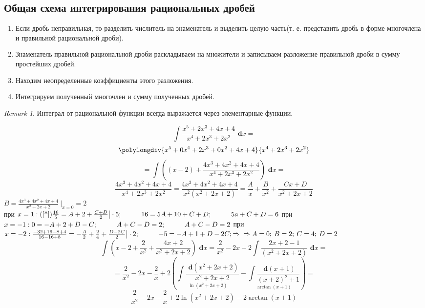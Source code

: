 \documentclass[a4paper,12pt, centered]{bookest}
\theoremstyle{remark}
\newtheorem*{remark}{Remark}
\newcommand\tab[1][1cm]{\hspace*{#1}}
\newcommand\dx{\textbf{ d}x}
\newcommand\dy{\textbf{ d}}
\begin{document}
\subsection{Общая схема интегрирования рациональных дробей}
\begin{enumerate}
	\item Если дробь неправильная, то разделить числитель на знаменатель и выделить целую часть(т. е. представить дробь в форме многочлена и правильной рациональной дроби).
	\item Знаменатель правильной рациональной дроби раскладываем на множители и записываем разложение правильной дроби в сумму простейших дробей.
	\item Находим неопределенные коэффициенты этого разложения.
	\item Интегрируем полученный многочлен и сумму полученных дробей.	  
\end{enumerate}
\begin{remark}
Интеграл от рациональной функции всегда выражается через элементарные функции.	
\end{remark}
\begin{example}
	$$\int \frac{x^5+2x^3+4x+4}{x^4+2x^3+2x^2}\dx=$$
		\[
    		\polylongdiv{x^5+0x^4+2x^3+0x^2+4x+4}{x^4+2x^3+2x^2}
  		\]
	$$=\int \left((x-2)+\frac{4x^3+4x^2+4x+4}{x^4+2x^3+2x^2}\right)\dx=$$
	\begin{equation}\label{*}
		\frac{4x^3+4x^2+4x+4}{x^4+2x^3+2x^2}=\frac{4x^3+4x^2+4x+4}{x^2(x^2+2x+2)}=\frac Ax+\frac B{x^2}+\frac{Cx+D}{x^2+2x+2}
	\end{equation}
	$
	B=\frac{4x^3+4x^2+4x+4}{x^2+2x+2}\>\bigg|_{x=0}=2
	$\\ при $x=1:(\ref{*})\\ \frac {16}{5}=A+2+\frac{C+D}{2}\big|\cdot 5;\tab  16=5A+10+C+D; \tab 5a+C+D=6\\\\$
	при $x=-1:\\ 0= -A+2+D-C;\tab A+C-D=2;\tab A+C-D=2\\\\$
	при $x=-2:\\ \frac{-32+16-8+4}{16-16+8}=-\frac A2+\frac24+\frac{D-2C}{2}\big|\cdot2;\tab -5=-A+1+D-2C;\Rightarrow\\\\\Rightarrow A=0;\>B=2;\>C=4;\>D=2$
	$$\int \left(x-2 +\frac2{x^2}+\frac{4x+2}{x^2+2x+2} \right)\dx=\frac2{x^2}-2x+2\int \frac{2x+2-1}{(x^2+2x+2)}\dx=$$
	$$=\frac2{x^2}-2x-\frac2x+2\left(\underset{\ln(x^2+2x+2)}{\int \frac{\dy (x^2+2x+2)}{x^2+2x+2}}-\underset{\arctan (x+1)}{\int\frac{\dy (x+1)}{(x+2)^2+1}}\right)=$$
	$$\frac2{x^2}-2x-\frac2x+2\ln(x^2+2x+2)-2\arctan (x+1)$$
\end{example}
\end{document}

